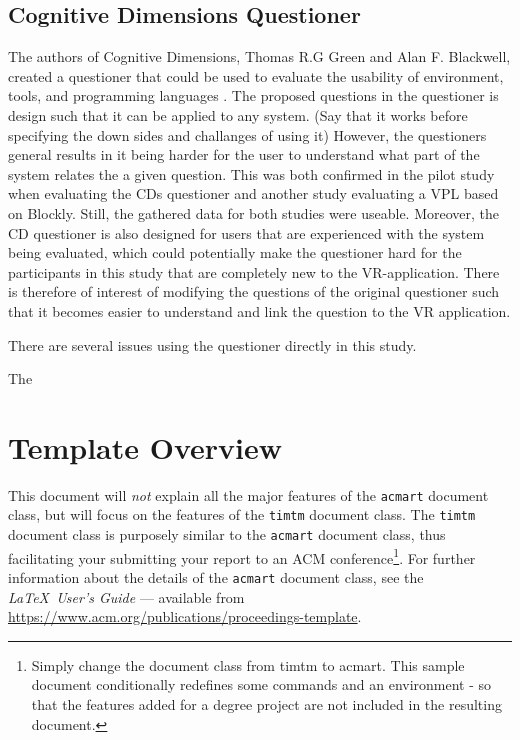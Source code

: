 \documentclass[screen, sigcconf]{timtm}
\begin{document}
\subsection{Cognitive Dimensions Questioner}
The authors of Cognitive Dimensions, Thomas R.G Green and Alan F. Blackwell, created a questioner that could be used to evaluate the usability of environment, tools, and programming languages \cite{blackwell_cognitive_2000}. The proposed questions in the questioner is design such that it can be applied to any system. (Say that it works before specifying the down sides and challanges of using it) However, the questioners general results in it being harder for the user to understand what part of the system relates the a given question. This was both confirmed in the pilot study when evaluating the CDs questioner \cite{blackwell_cognitive_2000} and another study evaluating a VPL based on Blockly\cite{holwerda_usability_2018}. Still, the gathered data for both studies were useable. Moreover, the CD questioner is also designed for users that are experienced with the system being evaluated, which could potentially make the questioner hard for the participants in this study that are completely new to the VR-application. There is therefore of interest of modifying the questions of the  original questioner such that it becomes easier to understand and link the question to the VR application.

There are several issues using the questioner directly in this study. 

The 

\section{Template Overview}

This document will \emph{not} explain all the major features of the \verb|acmart| document
class, but will focus on the features of the \verb|timtm| document
class. The \verb|timtm| document
class is purposely similar to the \verb|acmart| document
class, thus facilitating your submitting your report to an ACM conference\footnote{Simply change the document class from timtm to acmart. This sample document conditionally redefines some commands and an environment - so that the features added for a degree project are not included in the resulting document.}. For further information about the details of the \verb|acmart| document
class, see the {\itshape \LaTeX\ User's Guide} --- 
available from \url{https://www.acm.org/publications/proceedings-template}.
\end{document}
